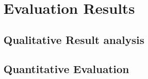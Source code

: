 \section{Evaluation Results}

\subsection{Qualitative Result analysis}

\subsection{Quantitative Evaluation}

